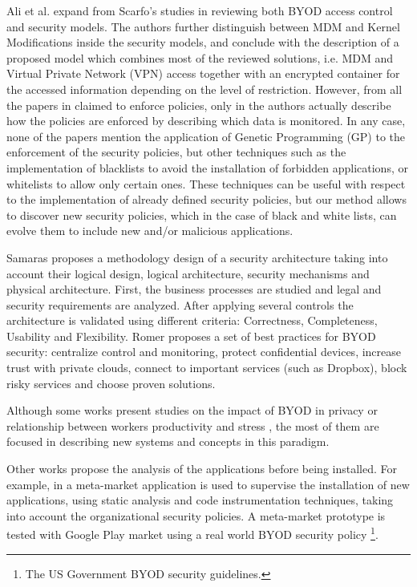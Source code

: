 Ali et al. expand from Scarfo's studies in \cite{ali2015analysis} reviewing both BYOD access control  and security models. The authors further distinguish between MDM and Kernel Modifications inside the security models, and conclude with the description of a proposed model which combines most of the reviewed solutions, i.e. MDM and Virtual Private Network (VPN) access together with an encrypted container for the accessed information depending on the level of restriction. However, from all the papers in \cite{ali2015analysis} claimed to enforce policies, only in \cite{rhee2013high} the authors actually describe how the policies are enforced by describing which data is monitored. In any case, none of the papers mention the application of Genetic Programming (GP) to the enforcement of the security policies, but other techniques such as the implementation of blacklists to avoid the installation of forbidden applications, or whitelists to allow only certain ones. These techniques can be useful with respect to the implementation of already defined security policies, but our method allows to discover new security policies, which in the case of black and white lists, can evolve them to include new and/or malicious applications.

Samaras \cite{Samaras13SaaS} proposes a methodology design of a security architecture taking into account their logical design, logical architecture, security mechanisms and physical architecture. First, the business processes are studied and legal and security requirements are analyzed. After applying several controls the architecture is validated using different criteria: Correctness, Completeness, Usability and Flexibility. Romer \cite{Romer14BestPractices} proposes a set of best practices for BYOD security: centralize control and monitoring, protect confidential devices, increase trust with private clouds, connect to important services (such as Dropbox), block risky services and choose proven solutions.

Although some works present studies on the impact of BYOD in privacy \cite{Miller12Privacy} or relationship between workers productivity and stress \cite{Haejung12Door}, the most of them are focused in describing new systems and concepts in this paradigm.

Other works propose the analysis of the applications before being installed. For example, in \cite{Armando14metamarket} a meta-market application is used to supervise the installation of new applications, using static analysis and code instrumentation techniques, taking into account the organizational security policies. A meta-market prototype is tested with Google Play market using a real world BYOD security policy \footnote{The US Government BYOD security guidelines.}.


